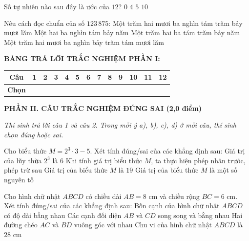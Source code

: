 \documentclass[12pt,a4paper]{article}
\begin{document}
\begin{ex}
Số tự nhiên nào sau đây là ước của $12$?
\choice
{$0$}
{\True $4$}
{$5$}
{$10$}
\end{ex}

\begin{ex}
Nêu cách đọc chuẩn của số $123\,875$:
\choice
{\True Một trăm hai mươi ba nghìn tám trăm bảy mươi lăm}
{Một hai ba nghìn tám bảy năm}
{Một trăm hai ba tám trăm bảy năm}
{Một trăm hai mươi ba nghìn bảy trăm tám mươi lăm}
\end{ex}


\vspace{1mm}
\noindent\textbf{BẢNG TRẢ LỜI TRẮC NGHIỆM PHẦN I:}
\begin{center}
\begin{tabular}{|c|c|c|c|c|c|c|c|c|c|c|c|c|}
\hline
\textbf{Câu} & \textbf{1} & \textbf{2} & \textbf{3} & \textbf{4} & \textbf{5} & \textbf{6} & \textbf{7} & \textbf{8} & \textbf{9} & \textbf{10} & \textbf{11} & \textbf{12} \\
\hline
\textbf{Chọn} & \rule{0pt}{0.65cm} & & & & & & & & & & & \\
\hline
\end{tabular}
\end{center}
\vspace{2mm}

\setcounter{ex}{0}
\noindent\textbf{\large PHẦN II. CÂU TRẮC NGHIỆM ĐÚNG SAI (2,0 điểm)}

\textit{Thí sinh trả lời câu 1 và câu 2. Trong mỗi ý a), b), c), d) ở mỗi câu, thí sinh chọn đúng hoặc sai.}

\vspace{1mm}
\begin{ex}
Cho biểu thức $M = 2^3 \cdot 3 - 5$. Xét tính đúng/sai của các khẳng định sau:
\choiceTF
{Giá trị của lũy thừa $2^3$ là $6$}
{Khi tính giá trị biểu thức $M$, ta thực hiện phép nhân trước, phép trừ sau}
{\True Giá trị của biểu thức $M$ là $19$}
{\True Giá trị của biểu thức $M$ là một số nguyên tố}
\end{ex}

\begin{ex}
Cho hình chữ nhật $ABCD$ có chiều dài $AB = 8\text{ cm}$ và chiều rộng $BC = 6\text{ cm}$. Xét tính đúng/sai của các khẳng định sau:
\choiceTF
{Bốn cạnh của hình chữ nhật $ABCD$ có độ dài bằng nhau}
{\True Các cạnh đối diện $AB$ và $CD$ song song và bằng nhau}
{Hai đường chéo $AC$ và $BD$ vuông góc với nhau}
{\True Chu vi của hình chữ nhật $ABCD$ là $28\text{ cm}$}
\end{ex}
\end{document}
